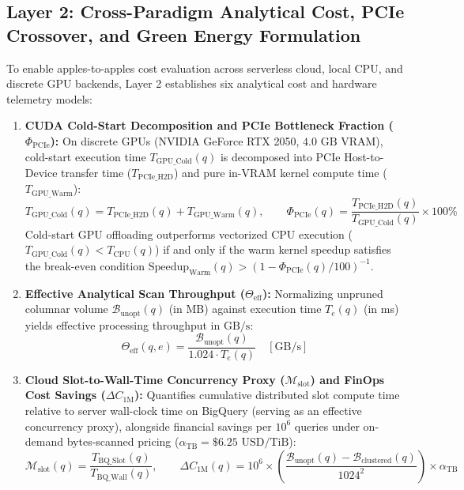 \documentclass[10pt,a4paper]{article}
\begin{document}
\subsection{Layer 2: Cross-Paradigm Analytical Cost, PCIe Crossover, and Green Energy Formulation}
To enable apples-to-apples cost evaluation across serverless cloud, local CPU, and discrete GPU backends, Layer 2 establishes six analytical cost and hardware telemetry models:
\begin{enumerate}[leftmargin=1.5em,itemsep=3pt]
    \item \textbf{CUDA Cold-Start Decomposition and PCIe Bottleneck Fraction ($\Phi_{\text{PCIe}}$):} On discrete GPUs (NVIDIA GeForce RTX 2050, $4.0\text{ GB}$ VRAM), cold-start execution time $T_{\text{GPU\_Cold}}(q)$ is decomposed into PCIe Host-to-Device transfer time ($T_{\text{PCIe\_H2D}}$) and pure in-VRAM kernel compute time ($T_{\text{GPU\_Warm}}$):
    \begin{equation}
        T_{\text{GPU\_Cold}}(q) = T_{\text{PCIe\_H2D}}(q) + T_{\text{GPU\_Warm}}(q), \qquad \Phi_{\text{PCIe}}(q) = \frac{T_{\text{PCIe\_H2D}}(q)}{T_{\text{GPU\_Cold}}(q)} \times 100\%
    \end{equation}
    Cold-start GPU offloading outperforms vectorized CPU execution ($T_{\text{GPU\_Cold}}(q) < T_{\text{CPU}}(q)$) if and only if the warm kernel speedup satisfies the break-even condition $\text{Speedup}_{\text{Warm}}(q) > (1 - \Phi_{\text{PCIe}}(q)/100)^{-1}$.
    \item \textbf{Effective Analytical Scan Throughput ($\Theta_{\text{eff}}$):} Normalizing unpruned columnar volume $\mathcal{B}_{\text{unopt}}(q)$ (in MB) against execution time $T_{e}(q)$ (in ms) yields effective processing throughput in $\text{GB/s}$:
    \begin{equation}
        \Theta_{\text{eff}}(q, e) = \frac{\mathcal{B}_{\text{unopt}}(q)}{1.024 \cdot T_{e}(q)} \quad [\text{GB/s}]
    \end{equation}
    \item \textbf{Cloud Slot-to-Wall-Time Concurrency Proxy ($\mathcal{M}_{\text{slot}}$) and FinOps Cost Savings ($\Delta C_{\text{1M}}$):} Quantifies cumulative distributed slot compute time relative to server wall-clock time on BigQuery (serving as an effective concurrency proxy), alongside financial savings per $10^6$ queries under on-demand bytes-scanned pricing ($\alpha_{\text{TB}} = \$6.25\text{ USD/TiB}$):
    \begin{equation}
        \mathcal{M}_{\text{slot}}(q) = \frac{T_{\text{BQ\_Slot}}(q)}{T_{\text{BQ\_Wall}}(q)}, \qquad \Delta C_{\text{1M}}(q) = 10^6 \times \left( \frac{\mathcal{B}_{\text{unopt}}(q) - \mathcal{B}_{\text{clustered}}(q)}{1024^2} \right) \times \alpha_{\text{TB}}

\end{equation}
\end{enumerate}
\end{document}
